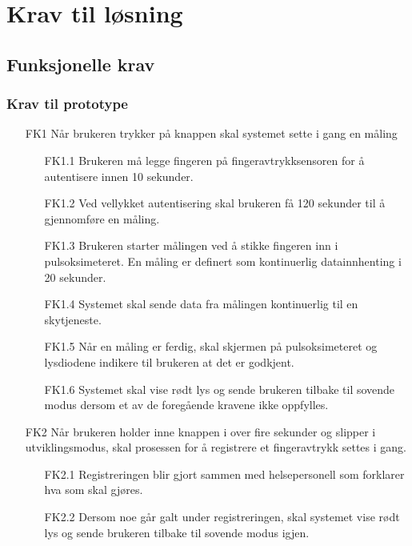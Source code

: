 \chapter{Krav til løsning}
\label{ch:requirements}

\section{Funksjonelle krav}


\subsection{Krav til prototype}

\begin{enumerate}
    \item [FK1] Når brukeren trykker på knappen skal systemet sette i gang en måling
        \begin{enumerate}
          \item [FK1.1] Brukeren må legge fingeren på fingeravtrykksensoren for å autentisere innen 10 sekunder.
          \item [FK1.2] Ved vellykket autentisering skal brukeren få 120 sekunder til å gjennomføre
              en måling.
          \item [FK1.3] Brukeren starter målingen ved å stikke fingeren inn i pulsoksimeteret.
              En måling er definert som kontinuerlig datainnhenting i 20 sekunder.
          \item [FK1.4] Systemet skal sende data fra målingen kontinuerlig til en skytjeneste.
          \item [FK1.5] Når en måling er ferdig, skal skjermen på pulsoksimeteret og lysdiodene indikere til brukeren
              at det er godkjent.
          \item [FK1.6]Systemet skal vise rødt lys og sende brukeren tilbake til sovende modus dersom et av de
              foregående kravene ikke oppfylles.
        \end{enumerate}
    \item [FK2] Når brukeren holder inne knappen i over fire sekunder og slipper i utviklingsmodus,
        skal prosessen for å registrere et fingeravtrykk settes i gang.
        \begin{enumerate}
          \item [FK2.1] Registreringen blir gjort sammen med helsepersonell som forklarer hva som skal gjøres.
          \item [FK2.2] Dersom noe går galt under registreringen, skal systemet vise rødt lys og sende brukeren
              tilbake til sovende modus igjen.
        \end{enumerate}
\end{enumerate}

